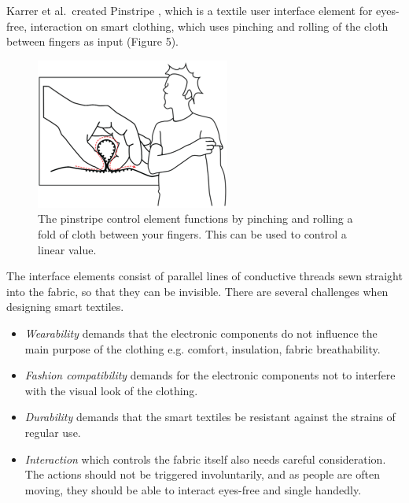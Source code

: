 Karrer et al.\ created Pinstripe \cite{karrer11}, which is a textile user interface element for eyes-free, interaction on smart clothing, which uses pinching and rolling of the cloth between fingers as input (Figure 5).
\begin{figure}[!t]
	\centering
	\includegraphics[width=0.9\columnwidth]{Images/pinstripe}
	\caption{The pinstripe control element functions by pinching and rolling a fold of cloth between your fingers. This can be used to control a linear value.}
	\label{fig:pinstripe}
\end{figure}
The interface elements consist of parallel lines of conductive threads sewn straight into the fabric, so that they can be invisible.
There are several challenges when designing smart textiles.
\begin{itemize}
	\item \emph{Wearability} demands that the electronic components do not influence the main purpose of the clothing e.g. comfort, insulation, fabric breathability. 
	\item \emph{Fashion compatibility} demands for the electronic components not to interfere with the visual look of the clothing. 
	\item \emph{Durability} demands that the smart textiles be resistant against the strains of regular use.
	\item \emph{Interaction} which controls the fabric itself also needs careful consideration.
	The actions should not be triggered involuntarily, and as people are often moving, they should be able to interact eyes-free and single handedly.
\end{itemize} 

